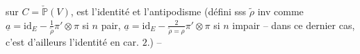 sur $C=\check{\mathbb P}(V)$, est l'identité et l'antipodisme (défini sss $\widetilde\rho$ inv  comme $\underline a=\mathrm{id}_E-\frac1{\widetilde\rho}\pi'\otimes\pi$ si $n$ pair, $\underline a=\mathrm{id}_E-\frac2{\widetilde\rho=\rho}\pi'\otimes\pi$ si $n$ impair -- dans ce dernier cas, c'est d'ailleurs l'identité en car. $2$.) --


